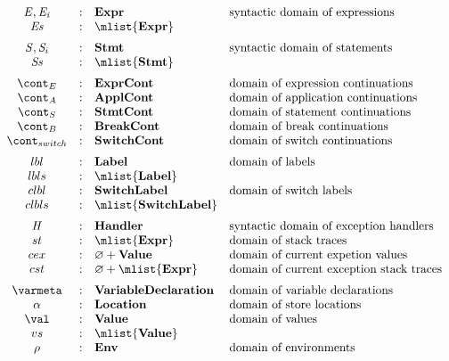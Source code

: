 \documentclass{article}
\renewcommand{\emptyset}{\varnothing}
\begin{document}
\newcommand{\dclass}{\mathbf{Class}}
\newcommand{\dformals}{\mathbf{Formals}}
\[
  \begin{array}{ccll}
	\expr, \expri{i}
	& : & \dexpr & \textrm{syntactic domain of expressions}\\
	\exprs
	& : & \mlist{\dexpr}\\[2mm]

	\stmt, \stmti{i}
	& : & \dstmt & \textrm{syntactic domain of statements}\\
	\stmts
	& : & \mlist{\dstmt}  & \textrm{}\\[2mm]

	\econt
	& : & \decont & \textrm{domain of expression continuations}\\
	\acont
	& : & \dacont & \textrm{domain of application continuations}\\
	\scont
	& : & \dscont & \textrm{domain of statement continuations}\\
	\bcont
	& : & \dbcont & \textrm{domain of break continuations}\\
	\switchcont
	& : & \dswitchcont & \textrm{domain of switch continuations}\\[2mm]

	\lbl & : & \dlbl & \textrm{domain of labels}\\
	\lbls & : & \mlist{\dlbl} \\
	\clbl & : & \dclbl & \textrm{domain of switch labels}\\
	\clbls & : & \mlist{\dclbl} \\[2mm]

	\handler
	& : & \dhandler & \textrm{syntactic domain of exception handlers} \\
	\strace
	& : & \mlist{\dexpr} & \textrm{domain of stack traces}\\
	\cex
	& : &  \emptyset + \dval & \textrm{domain of current expetion values}\\
	\cstrace
	& : & \emptyset + \mlist{\dexpr} & \textrm{domain of current exception stack traces}\\[2mm]

	\varmeta
	& : & \dvardecl & \textrm{domain of variable declarations}\\
	\loc
	& : & \dlocation & \textrm{domain of store locations}\\
	\val
	& : & \dval & \textrm{domain of values}\\
	\vals
	& : & \mlist{\dval}\\
	\env
	& : & \denv & \textrm{domain of environments}\\[2mm]
  \end{array}
\]
\end{document}
